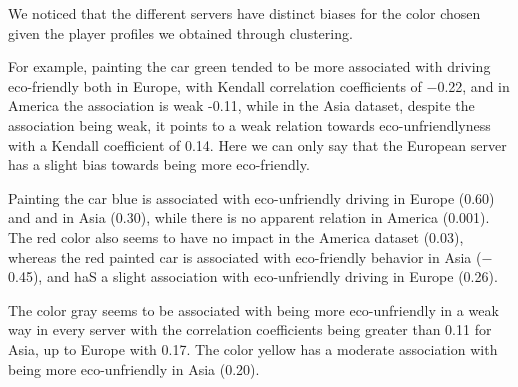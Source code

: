 \documentclass[preprint,authoryear,12pt]{elsarticle}
\begin{document}
We noticed that the different servers have distinct biases for the color chosen given the player profiles we obtained through clustering. 


For example, painting the car green tended to be more associated with driving eco-friendly both in Europe, with Kendall correlation coefficients of $-$0.22, and in America the association is weak -0.11, while in the Asia dataset, despite the association being weak, it points to a weak relation towards eco-unfriendlyness with a Kendall coefficient of 0.14. Here we can only say that the European server has a slight bias towards being more eco-friendly. 

Painting the car blue is associated with eco-unfriendly driving in Europe (0.60) and and in Asia (0.30), while there is no apparent relation in America (0.001).
The red color also seems to have no impact in the America dataset (0.03), whereas the red painted car is associated with eco-friendly behavior in Asia ($-$0.45), and haS a slight association with eco-unfriendly driving in Europe (0.26).

The color gray seems to be associated with being more eco-unfriendly in a weak way in every server with the correlation coefficients being greater than 0.11 for Asia, up to Europe with 0.17. The color yellow has a moderate association with being more eco-unfriendly in Asia (0.20).

%


\end{document}
